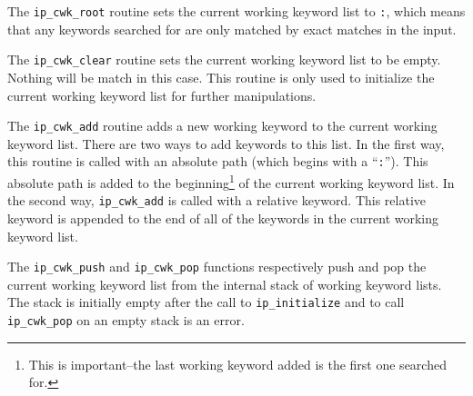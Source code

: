 The \verb|ip_cwk_root| routine sets the current working keyword list
to \verb|:|, which means that any keywords searched for are only
matched by exact matches in the input.

The \verb|ip_cwk_clear| routine sets the current working keyword list
to be empty.  Nothing will be match in this case.  This routine is
only used to initialize the current working keyword list for further
manipulations.

The \verb|ip_cwk_add| routine adds a new working keyword to the
current working keyword list.  There are two ways to add keywords
to this list.  In the first way, this routine is called with an
absolute path (which begins with a ``\verb|:|'').  This absolute
path is added to the beginning\footnote{This is important--the
last working keyword added is the first one searched for.} of the current
working keyword list.  In the second way, \verb|ip_cwk_add| is
called with a relative keyword.  This relative keyword is appended to
the end of all of the keywords in the current working keyword list.

The \verb|ip_cwk_push| and \verb|ip_cwk_pop| functions respectively
push and pop the current working keyword list from the internal stack of
working keyword lists.  The stack is initially empty after the call
to \verb|ip_initialize| and to call \verb|ip_cwk_pop| on an empty
stack is an error.

